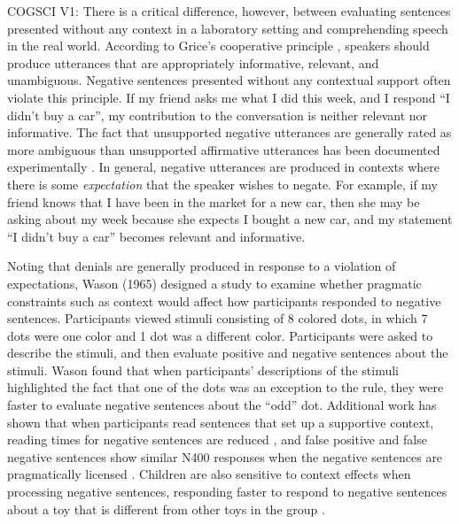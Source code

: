 \documentclass[man]{apa2}
\begin{document}
COGSCI V1:
There is a critical difference, however, between evaluating sentences presented without any context in a laboratory setting and comprehending speech in the real world. According to Grice's cooperative principle \cite{grice1975}, speakers should produce utterances that are appropriately informative, relevant, and unambiguous.  Negative sentences presented without any contextual support often violate this principle.  If my friend asks me what I did this week, and I respond ``I didn't buy a car'', my contribution to the conversation is neither relevant nor informative.  The fact that unsupported negative utterances are generally rated as more ambiguous than unsupported affirmative utterances has been documented experimentally \cite{glenberg1999}.  In general, negative utterances are produced in contexts where there is some \emph{expectation} that the speaker wishes to negate.  For example, if my friend knows that I have been in the market for a new car, then she may be asking about my week because she expects I bought a new car, and my statement ``I didn't buy a car'' becomes relevant and informative.  

Noting that denials are generally produced in response to a violation of expectations, Wason (1965) designed a study to examine whether pragmatic constraints such as context would affect how participants responded to negative sentences.  Participants viewed stimuli consisting of 8 colored dots, in which 7 dots were one color and 1 dot was a different color.  Participants were asked to describe the stimuli, and then evaluate positive and negative sentences about the stimuli.  Wason found that when participants' descriptions of the stimuli highlighted the fact that one of the dots was an exception to the rule, they were faster to evaluate negative sentences about the ``odd'' dot.  Additional work has shown that when participants read sentences that set up a supportive context, reading times for negative sentences are reduced \cite{glenberg1999}, and false positive and false negative sentences show similar N400 responses when the negative sentences are pragmatically licensed \cite{nieuwland2008}.  Children are also sensitive to context effects when processing negative sentences, responding faster to respond to negative sentences about a toy that is different from other toys in the group \cite{devilliers1975}.
\end{document}
